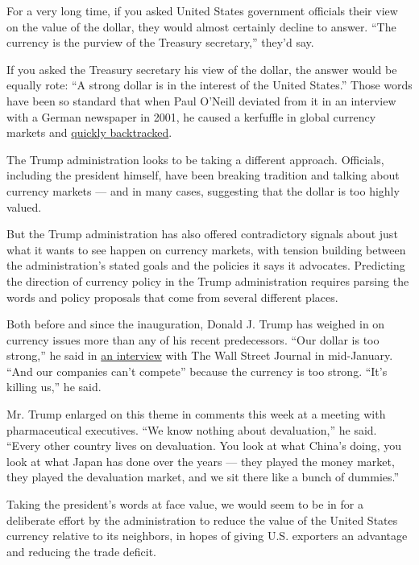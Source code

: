 For a very long time, if you asked United States government officials
their view on the value of the dollar, they would almost certainly
decline to answer. ``The currency is the purview of the Treasury
secretary,'' they'd say.

If you asked the Treasury secretary his view of the dollar, the answer
would be equally rote: ``A strong dollar is in the interest of the
United States.'' Those words have been so standard that when Paul
O'Neill deviated from it in an interview with a German newspaper in
2001, he caused a kerfuffle in global currency markets and
\href{https://www.wsj.com/articles/SB982535321468562836}{quickly
backtracked}.

The Trump administration looks to be taking a different approach.
Officials, including the president himself, have been breaking tradition
and talking about currency markets --- and in many cases, suggesting
that the dollar is too highly valued.

But the Trump administration has also offered contradictory signals
about just what it wants to see happen on currency markets, with tension
building between the administration's stated goals and the policies it
says it advocates. Predicting the direction of currency policy in the
Trump administration requires parsing the words and policy proposals
that come from several different places.

Both before and since the inauguration, Donald J. Trump has weighed in
on currency issues more than any of his recent predecessors. ``Our
dollar is too strong,'' he said in
\href{https://www.wsj.com/articles/trump-comments-signal-shift-in-approach-to-u-s-dollar-1484690469}{an
interview} with The Wall Street Journal in mid-January. ``And our
companies can't compete'' because the currency is too strong. ``It's
killing us,'' he said.

Mr. Trump enlarged on this theme in comments this week at a meeting with
pharmaceutical executives. ``We know nothing about devaluation,'' he
said. ``Every other country lives on devaluation. You look at what
China's doing, you look at what Japan has done over the years --- they
played the money market, they played the devaluation market, and we sit
there like a bunch of dummies.''

Taking the president's words at face value, we would seem to be in for a
deliberate effort by the administration to reduce the value of the
United States currency relative to its neighbors, in hopes of giving
U.S. exporters an advantage and reducing the trade deficit.


